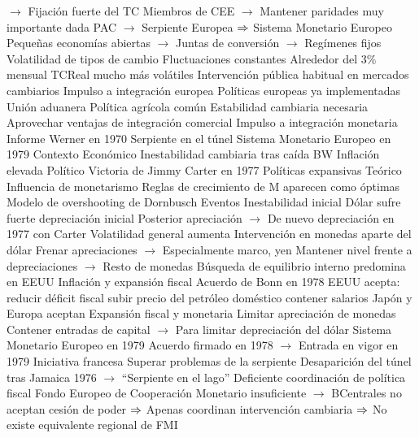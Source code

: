 \documentclass{nuevotema}
\begin{document}
\begin{esquemal}
				\4[] $\to$ Fijación fuerte del TC
				\4[] Miembros de CEE
				\4[] $\to$ Mantener paridades muy importante dada PAC
				\4[] $\to$ Serpiente Europea
				\4[] $\then$ Sistema Monetario Europeo
				\4[] Pequeñas economías abiertas
				\4[] $\to$ Juntas de conversión
				\4[] $\to$ Regímenes fijos
			\3 Volatilidad de tipos de cambio
				\4 Fluctuaciones constantes
				\4 Alrededor del $3\%$ mensual
				\4 TCReal mucho más volátiles
				\4 Intervención pública habitual en mercados cambiarios
			\3 Impulso a integración europea
				\4 Políticas europeas ya implementadas
				\4[] Unión aduanera
				\4[] Política agrícola común
				\4 Estabilidad cambiaria necesaria
				\4[] Aprovechar ventajas de integración comercial
				\4[$\then$] Impulso a integración monetaria
				\4[] Informe Werner en 1970
				\4[] Serpiente en el túnel
				\4[] Sistema Monetario Europeo en 1979
	\1 
		\2 Contexto
			\3 Económico
				\4 Inestabilidad cambiaria tras caída BW
				\4 Inflación elevada
			\3 Político
				\4 Victoria de Jimmy Carter en 1977
				\4 Políticas expansivas
			\3 Teórico
				\4 Influencia de monetarismo
				\4 Reglas de crecimiento de M aparecen como óptimas
				\4 Modelo de overshooting de Dornbusch
		\2 Eventos
			\3 Inestabilidad inicial
				\4 Dólar sufre fuerte depreciación inicial
				\4[] Posterior apreciación
				\4[] $\to$ De nuevo depreciación en 1977 con Carter
				\4 Volatilidad general aumenta
				\4 Intervención en monedas aparte del dólar
				\4[] Frenar apreciaciones
				\4[] $\to$ Especialmente marco, yen
				\4[] Mantener nivel frente a depreciaciones
				\4[] $\to$ Resto de monedas
				\4 Búsqueda de equilibrio interno predomina en EEUU
				\4[] Inflación y expansión fiscal
			\3 Acuerdo de Bonn en 1978
				\4 EEUU acepta:
				\4[] reducir déficit fiscal
				\4[] subir precio del petróleo doméstico
				\4[] contener salarios
				\4 Japón y Europa aceptan
				\4[] Expansión fiscal y monetaria
				\4[] Limitar apreciación de monedas
				\4[] Contener entradas de capital
				\4[] $\to$ Para limitar depreciación del dólar
			\3 Sistema Monetario Europeo en 1979
				\4 Acuerdo firmado en 1978
				\4[] $\to$ Entrada en vigor en 1979
				\4 Iniciativa francesa
				\4 Superar problemas de la serpiente
				\4[] Desaparición del túnel tras Jamaica 1976
				\4[] $\to$ ``Serpiente en el lago''
				\4[] Deficiente coordinación de política fiscal
				\4[] Fondo Europeo de Cooperación Monetario insuficiente
				\4[] $\to$ BCentrales no aceptan cesión de poder
				\4[] $\then$ Apenas coordinan intervención cambiaria
				\4[] $\then$ No existe equivalente regional de FMI

\end{esquemal}
\end{document}
